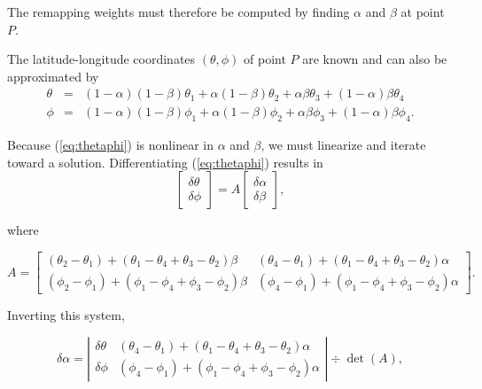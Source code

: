      The remapping weights must therefore be computed by finding $\alpha$ and
     $\beta$ at point $P$.  

     The latitude-longitude coordinates $(\theta,\phi)$ of point $P$ are known
     and can also be approximated by
\begin{eqnarray}\label{eq:thetaphi}
\theta & = & (1-\alpha)(1-\beta)\theta_1 + \alpha(1-\beta)\theta_2 + \nonumber
          \alpha\beta \theta_3 + (1-\alpha)\beta \theta_4 \\
\phi   & = & (1-\alpha)(1-\beta)\phi_1   + \alpha(1-\beta)\phi_2 +
          \alpha\beta \phi_3 + (1-\alpha)\beta \phi_4.
\end{eqnarray}

     Because (\ref{eq:thetaphi}) is nonlinear in $\alpha$ and $\beta$, we must
     linearize and iterate toward a solution.  Differentiating 
     (\ref{eq:thetaphi}) results in
\begin{equation}
\left[\begin{array}{c} \delta\theta \\ \delta\phi \end{array}\right] = A
\left[\begin{array}{c} \delta\alpha \\ \delta\beta \end{array}\right],
\end{equation}

     where

\begin{equation}
A = \left[\begin{array}{cc}
(\theta_2-\theta_1) + (\theta_1-\theta_4+\theta_3-\theta_2)\beta &
(\theta_4-\theta_1) + (\theta_1-\theta_4+\theta_3-\theta_2)\alpha \\
(\phi_2-\phi_1) + (\phi_1-\phi_4+\phi_3-\phi_2)\beta &
(\phi_4-\phi_1) + (\phi_1-\phi_4+\phi_3-\phi_2)\alpha
\end{array}\right].
\end{equation}

     Inverting this system,

\begin{equation}\label{eq:dalpha}
\delta\alpha = \left|\begin{array}{cc}
\delta\theta &
(\theta_4-\theta_1) + (\theta_1-\theta_4+\theta_3-\theta_2)\alpha \\
\delta\phi &
(\phi_4-\phi_1) + (\phi_1-\phi_4+\phi_3-\phi_2)\alpha 
\end{array}\right| \div \det(A),
\end{equation}

